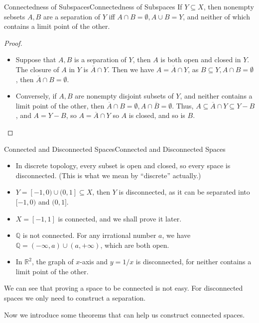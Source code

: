 \documentclass[../main.tex]{subfiles}
\begin{document}
\begin{lemma}{Connectedness of Subspaces}{Connectedness of Subspaces}
If $Y \subseteq X$, then nonempty sebsets $A,B$ are a separation of $Y$ iff $A\cap B = \emptyset ,A \cup B = Y$, and neither of which contains a limit point of the other.
\end{lemma}
\begin{proof}
\begin{itemize}
\item Suppose that $A, B$ is a separation of $Y$, then $A$ is both open and closed in $Y$. The closure of $A$ in $Y$ is $\overline{A}\cap Y$. Then we have $A = \overline{A}\cap Y$, as $B \subseteq Y, A\cap B = \emptyset $, then $\overline{A}\cap B = \emptyset $.
\item Conversely, if $A,B$ are nonempty disjoint subsets of $Y$, and neither contains a limit point of the other, then $\overline{A}\cap B = \emptyset ,A\cap \overline{B} = \emptyset $. Thus, $A \subseteq \overline{A}\cap Y \subseteq Y-B$, and $A = Y-B$, so $A = \overline{A}\cap Y$ so $A$ is closed, and so is $B$.
\end{itemize}
\end{proof}

\begin{example}{Connected and Disconnected Spaces}{Connected and Disconnected Spaces}
\begin{itemize}
\item In discrete topology, every subset is open and closed, so every space is disconnected. (This is what we mean by ``discrete'' actually.)
\item $Y = [-1,0)\cup (0,1] \subseteq X$, then $Y$ is disconnected, as it can be separated into $[-1,0)$ and $(0,1]$.
\item $X = [-1,1]$ is connected, and we shall prove it later.
\item $\mathbb{Q}$ is not connected. For any irrational number $a$, we have $\mathbb{Q} = (-\infty ,a) \cup (a, +\infty )$, which are both open.
\item In $\mathbb{R}^2$, the graph of $x$-axis and $y = 1 / x$ is disconnected, for neither contains a limit point of the other.
\end{itemize}
\end{example}

We can see that proving a space to be connected is not easy. For disconnected spaces we only need to construct a separation.

Now we introduce some theorems that can help us construct connected spaces.
\end{document}
